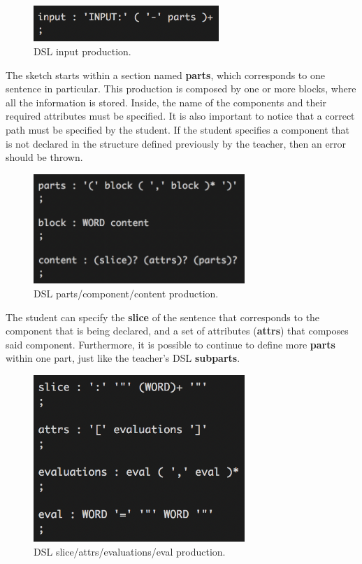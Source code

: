 \begin{figure}[h]
    \centering
    \includegraphics[width=7cm]{images/META_input.png}
    \caption{DSL input production.}
    \label{fig:dsl_input_production}
\end{figure}

The sketch starts within a section named \textbf{parts}, which corresponds to one sentence in particular. This production is composed by one or more blocks, where all the information is stored. Inside, the name of the components and their required attributes must be specified. It is also important to notice that a correct path must be specified by the student. If the student specifies a component that is not declared in the structure defined previously by the teacher, then an error should be thrown.

\begin{figure}[h]
    \centering
    \includegraphics[width=8cm]{images/META_parts.png}
    \caption{DSL parts/component/content production.}
    \label{fig:dsl_parts_production}
\end{figure}

The student can specify the \textbf{slice} of the sentence that corresponds to the component that is being declared, and a set of attributes (\textbf{attrs}) that composes said component. Furthermore, it is possible to continue to define more \textbf{parts} within one part, just like the teacher's \textsc{DSL} \textbf{subparts}.

\begin{figure}[h]
    \centering
    \includegraphics[width=8cm]{images/META_slice_attrs.png}
    \caption{DSL slice/attrs/evaluations/eval production.}
    \label{fig:dsl_slice_production}
\end{figure}

